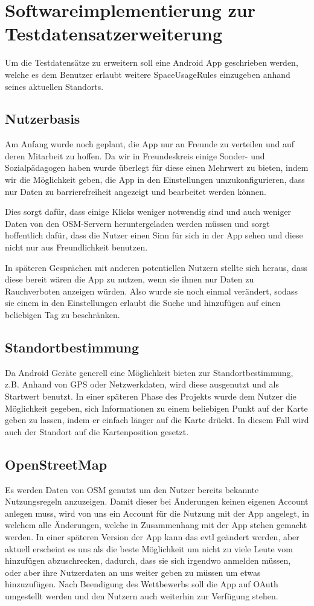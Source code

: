\section{Softwareimplementierung zur Testdatensatzerweiterung}
Um die Testdatensätze zu erweitern soll eine Android App geschrieben werden, welche es dem
Benutzer erlaubt weitere SpaceUsageRules einzugeben anhand seines aktuellen Standorts.
 
\subsection{Nutzerbasis}
Am Anfang wurde noch geplant, die App nur an Freunde zu verteilen und auf deren Mitarbeit zu hoffen. 
Da wir in Freundeskreis einige Sonder- und Sozialpädagogen haben wurde überlegt für diese einen Mehrwert zu bieten, 
indem wir die Möglichkeit geben, die App in den Einstellungen umzukonfigurieren, dass nur Daten zu barrierefreiheit angezeigt und bearbeitet werden können.

Dies sorgt dafür, dass einige Klicks weniger notwendig sind und auch weniger Daten von den OSM-Servern heruntergeladen werden müssen
und sorgt hoffentlich dafür, dass die Nutzer einen Sinn für sich in der App sehen und diese nicht nur aus Freundlichkeit benutzen.

In späteren Gesprächen mit anderen potentiellen Nutzern stellte sich heraus, dass diese bereit wären die App zu nutzen, 
wenn sie ihnen nur Daten zu Rauchverboten anzeigen würden.
Also wurde sie noch einmal verändert, sodass sie einem in den Einstellungen erlaubt die Suche und hinzufügen auf einen beliebigen Tag zu beschränken.

\subsection{Standortbestimmung}
Da Android Geräte generell eine Möglichkeit bieten zur Standortbestimmung, z.B. Anhand von GPS oder Netzwerkdaten, 
wird diese ausgenutzt und als Startwert benutzt.
In einer späteren Phase des Projekts wurde dem Nutzer die Möglichkeit gegeben, sich Informationen zu einem beliebigen Punkt auf der Karte geben zu lassen, 
indem er einfach länger auf die Karte drückt. In diesem Fall wird auch der Standort auf die Kartenposition gesetzt.

\subsection{OpenStreetMap}
Es werden Daten von OSM genutzt um den Nutzer bereits bekannte Nutzungsregeln anzuzeigen.
Damit dieser bei Änderungen keinen eigenen Account anlegen muss, wird von uns ein Account für die Nutzung mit der App angelegt, 
in welchem alle Änderungen, welche in Zusammenhang mit der App stehen gemacht werden.
In einer späteren Version der App kann das evtl geändert werden, aber aktuell erscheint es uns als die beste Möglichkeit
um nicht zu viele Leute vom hinzufügen abzuschrecken, dadurch, dass sie sich irgendwo anmelden müssen, 
oder aber ihre Nutzerdaten an uns weiter geben zu müssen um etwas hinzuzufügen.
Nach Beendigung des Wettbewerbs soll die App auf OAuth umgestellt werden und den Nutzern auch weiterhin zur Verfügung stehen.

